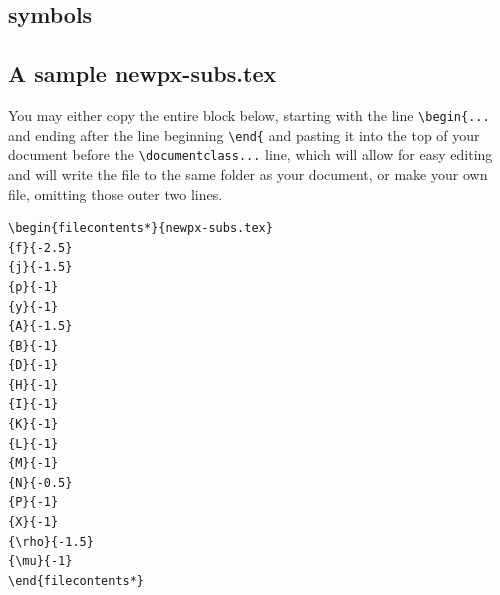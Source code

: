 \documentclass[11pt]{article}
\theoremstyle{oldplain}
\theoremstyle{plain}
\begin{document}
\subsection{symbols}
\newpage 
\subsection{A sample newpx-subs.tex}
You may either copy the entire block below, starting with the line \verb|\begin{...| and ending after the line beginning \verb|\end{|
and pasting it into the top of your document before the \verb|\documentclass...| line, which will allow for easy editing and will write the file to the same folder as your document, or make your own file, omitting those outer two lines.

\begin{verbatim}
\begin{filecontents*}{newpx-subs.tex}
{f}{-2.5}
{j}{-1.5}
{p}{-1}
{y}{-1}
{A}{-1.5}
{B}{-1}
{D}{-1}
{H}{-1}
{I}{-1}
{K}{-1}
{L}{-1}
{M}{-1}
{N}{-0.5}
{P}{-1}
{X}{-1}
{\rho}{-1.5}
{\mu}{-1}
\end{filecontents*}
\end{verbatim}
\end{document}
